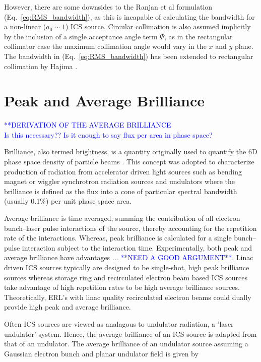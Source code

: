 \documentclass[../main.tex]{subfiles}
\begin{document}
However, there are some downsides to the Ranjan et al formulation (Eq.~\ref{eq:RMS_bandwidth}), as this is incapable of calculating the bandwidth for a non-linear ($a_{0}\sim 1$) ICS source. Circular collimation is also assumed implicitly by the inclusion of a single acceptance angle term $\Psi$, as in the rectangular collimator case the maximum collimation angle would vary in the $x$ and $y$ plane. The bandwidth in (Eq.~\ref{eq:RMS_bandwidth}) has been extended to rectangular collimation by Hajima \cite{hajima2021bandwidth}. 

\section{Peak and Average Brilliance}
\label{sec:peak_average_brilliance}

\textcolor{blue}{**DERIVATION OF THE AVERAGE BRILLIANCE \\ Is this necessary?? Is it enough to say flux per area in phase space?}

Brilliance, also termed brightness, is a quantity originally used to quantify the 6D phase space density of particle beams \cite{courant1958theory}. This concept was adopted to characterize production of radiation from accelerator driven light sources such as bending magnet or wiggler synchrotron radiation sources and undulators \cite{kim1989characteristics} where the brilliance is defined as the flux into a cone of particular spectral bandwidth (usually 0.1\%) per unit phase space area. 

Average brilliance is time averaged, summing the contribution of all electron bunch--laser pulse interactions of the source, thereby accounting for the repetition rate of the interactions. Whereas, peak brilliance is calculated for a single bunch--pulse interaction subject to the interaction time. Experimentally, both peak and average brilliance have advantages ... \textcolor{blue}{**NEED A GOOD ARGUMENT**}. Linac driven ICS sources typically are designed to be single-shot, high peak brilliance sources whereas storage ring and recirculated electron beam based ICS sources take advantage of high repetition rates to be high average brilliance sources. Theoretically, ERL's with linac quality recirculated electron beams could dually provide high peak and average brilliance.   

Often ICS sources are viewed as analagous to undulator radiation, a 'laser undulator' system. Hence, the average brilliance of an ICS source is adapted from that of an undulator. The average brilliance of an undulator source assuming a Gaussian electron bunch and planar undulator field \cite{chao2013handbook} is given by 
\end{document}
